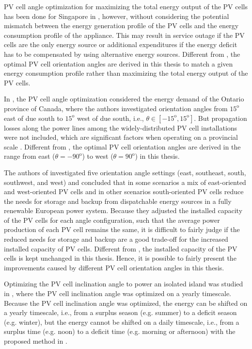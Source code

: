 PV cell angle optimization for maximizing the total energy output of the PV cells has been done for Singapore in \cite{irradianceModels}, however, without considering the potential mismatch between the energy generation profile of the PV cells and the energy consumption profile of the appliance. This may result in service outage if the PV cells are the only energy source or additional expenditures if the energy deficit has to be compensated by using alternative energy sources. Different from \cite{irradianceModels}, the optimal PV cell orientation angles are derived in this thesis to match a given energy consumption profile rather than maximizing the total energy output of the PV cells. 

In \cite{Kemery2012OptimalPO}, the PV cell angle optimization considered the energy demand of the Ontario province of Canada, where the authors investigated orientation angles from $15^\mathrm{o}$ east of due south to $15^\mathrm{o}$ west of due south, i.e., $\theta\in[-15^{\mathrm{o}},15^{\mathrm{o}}]$. But propagation losses along the power lines among the widely-distributed PV cell installations were not included, which are significant factors when operating on a provincial scale \cite{8491374,my_con3}. Different from \cite{Kemery2012OptimalPO}, the optimal PV cell orientation angles are derived in the range from east ($\theta=-90^\mathrm{o}$) to west ($\theta=90^\mathrm{o}$) in this thesis.

The authors of \cite{CHATTOPADHYAY2017176} investigated five orientation angle settings (east, southeast, south, southwest, and west) and concluded that in some scenarios a mix of east-oriented and west-oriented PV cells and in other scenarios south-oriented PV cells reduce the needs for storage and backup from dispatchable energy sources in a fully renewable European power system. Because they adjusted the installed capacity of the PV cells for each angle configuration, such that the average power production of each PV cell remains the same, it is difficult to fairly judge if the reduced needs for storage and backup are a good trade-off for the increased installed capacity of PV cells. Different from \cite{CHATTOPADHYAY2017176}, the installed capacity of the PV cells is kept unchanged in this thesis. Hence, it is possible to fairly present the improvements caused by different PV cell orientation angles in this thesis.


Optimizing the PV cell inclination angle to power an isolated island was studied in \cite{7315106}, where the PV cell inclination angle was optimized on a yearly timescale. Because the PV cell inclination angle was optimized, the energy can be shifted on a yearly timescale, i.e., from a surplus season (e.g. summer) to a deficit season (e.g. winter), but the energy cannot be shifted on a daily timescale, i.e., from a surplus time (e.g. noon) to a deficit time (e.g. morning or afternoon) with the proposed method in \cite{7315106}.  



